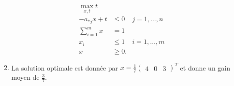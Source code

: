 \begin{enumerate}
\begin{solution}
\begin{enumerate}
          \begin{align*}
            \max_{x,t} t\\
            -a_{*j}x + t & \leq 0 & j = 1, \dots, n\\
            \sum_{i=1}^m x & = 1\\
            x_i & \leq 1 & i = 1, \dots, m\\
            x & \geq 0.
          \end{align*}
        \item La solution optimale est donnée par
        $x = \frac{1}{7}\begin{pmatrix}4 & 0 & 3\end{pmatrix}^T$ et donne
        un gain moyen de $\frac{3}{7}$.
      \end{enumerate}
    \end{solution}

\end{enumerate}
